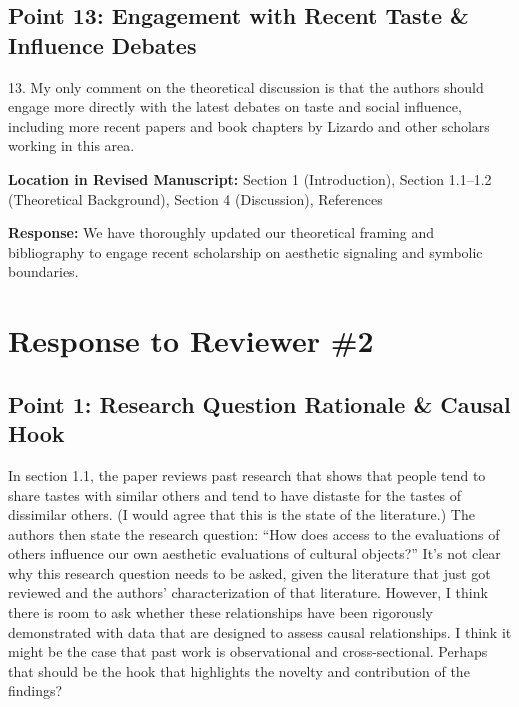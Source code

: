 \documentclass[11pt, letterpaper]{article}
\begin{document}
\vspace{10pt}

\subsection*{Point 13: Engagement with Recent Taste \& Influence Debates}

\begin{reviewercomment}
13. My only comment on the theoretical discussion is that the authors should engage more directly with the latest debates on taste and social influence, including more recent papers and book chapters by Lizardo and other scholars working in this area.
\end{reviewercomment}

\textbf{Location in Revised Manuscript:} Section 1 (Introduction), Section 1.1--1.2 (Theoretical Background), Section 4 (Discussion), References

\textbf{Response:}
We have thoroughly updated our theoretical framing and bibliography to engage recent scholarship on aesthetic signaling and symbolic boundaries.

\newpage

\section*{Response to Reviewer \#2}

\subsection*{Point 1: Research Question Rationale \& Causal Hook}

\begin{reviewercomment}
In section 1.1, the paper reviews past research that shows that people tend to share tastes with similar others and tend to have distaste for the tastes of dissimilar others. (I would agree that this is the state of the literature.) The authors then state the research question: ``How does access to the evaluations of others influence our own aesthetic evaluations of cultural objects?'' It's not clear why this research question needs to be asked, given the literature that just got reviewed and the authors' characterization of that literature. However, I think there is room to ask whether these relationships have been rigorously demonstrated with data that are designed to assess causal relationships. I think it might be the case that past work is observational and cross-sectional. Perhaps that should be the hook that highlights the novelty and contribution of the findings?
\end{reviewercomment}
\end{document}
